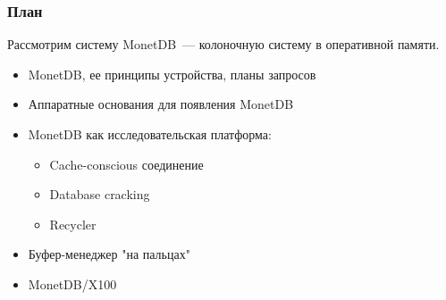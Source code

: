 \documentclass{beamer}
\begin{document}

\begin{frame}
\frametitle{План}

Рассмотрим систему MonetDB~--- колоночную систему в оперативной памяти.

\begin{itemize}
	\setlength\itemsep{1em}
	\item MonetDB, ее принципы устройства, планы запросов
	\item Аппаратные основания для появления MonetDB
	\item MonetDB как исследовательская платформа:
	\begin{itemize}
		\setlength\itemsep{1em}
		\item Cache-conscious соединение
		\item Database cracking
		\item Recycler
	\end{itemize}
	\item Буфер-менеджер "на пальцах"
	\item MonetDB/X100

\end{itemize}
\end{frame}
\end{document}
